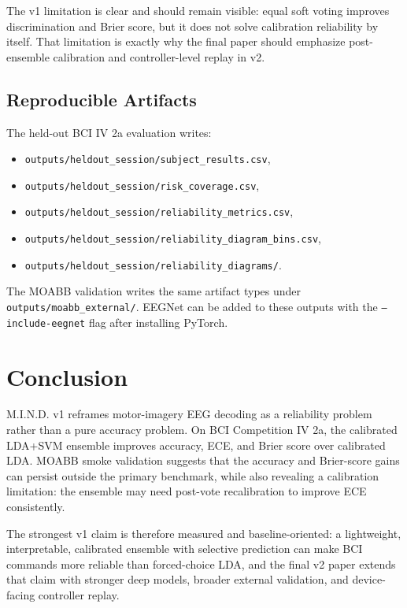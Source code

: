 \documentclass[11pt]{article}
\begin{document}
The v1 limitation is clear and should remain visible: equal soft voting
improves discrimination and Brier score, but it does not solve calibration
reliability by itself. That limitation is exactly why the final paper should
emphasize post-ensemble calibration and controller-level replay in v2.

\subsection{Reproducible Artifacts}

The held-out BCI IV 2a evaluation writes:
\begin{itemize}
  \item \texttt{outputs/heldout\_session/subject\_results.csv},
  \item \texttt{outputs/heldout\_session/risk\_coverage.csv},
  \item \texttt{outputs/heldout\_session/reliability\_metrics.csv},
  \item \texttt{outputs/heldout\_session/reliability\_diagram\_bins.csv},
  \item \texttt{outputs/heldout\_session/reliability\_diagrams/}.
\end{itemize}
The MOABB validation writes the same artifact types under
\texttt{outputs/moabb\_external/}. EEGNet can be added to these outputs with
the \texttt{--include-eegnet} flag after installing PyTorch.

\section{Conclusion}

M.I.N.D. v1 reframes motor-imagery EEG decoding as a reliability problem
rather than a pure accuracy problem. On BCI Competition IV 2a, the calibrated
LDA+SVM ensemble improves accuracy, ECE, and Brier score over calibrated LDA.
MOABB smoke validation suggests that the accuracy and Brier-score gains can
persist outside the primary benchmark, while also revealing a calibration
limitation: the ensemble may need post-vote recalibration to improve ECE
consistently.

The strongest v1 claim is therefore measured and baseline-oriented: a
lightweight, interpretable, calibrated ensemble with selective prediction can
make BCI commands more reliable than forced-choice LDA, and the final v2 paper
extends that claim with stronger deep models, broader external validation, and
device-facing controller replay.
\end{document}
